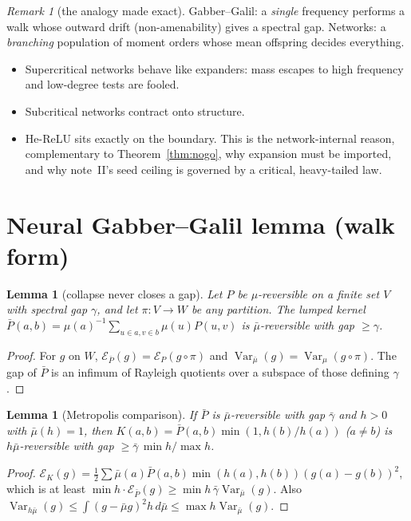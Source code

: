 \documentclass[11pt]{article}
\newtheorem{lemma}[theorem]{Lemma}
\theoremstyle{definition}
\theoremstyle{remark}
\newtheorem{remark}[theorem]{Remark}
\newcommand{\Var}{\operatorname{Var}}
\begin{document}
\begin{remark}[the analogy made exact]
Gabber--Galil: a \emph{single} frequency performs a walk whose outward drift (non-amenability) gives a spectral gap. Networks: a \emph{branching} population of moment orders whose mean offspring decides everything.
\begin{itemize}
\item Supercritical networks behave like expanders: mass escapes to high frequency and low-degree tests are fooled.
\item Subcritical networks contract onto structure.
\item He-ReLU sits exactly on the boundary. This is the network-internal reason, complementary to Theorem~\ref{thm:nogo}, why expansion must be imported, and why note~II's seed ceiling is governed by a critical, heavy-tailed law.
\end{itemize}
\end{remark}

\section{Neural Gabber--Galil lemma (walk form)}

\begin{lemma}[collapse never closes a gap]\label{lem:collapse}
Let $P$ be $\mu$-reversible on a finite set $V$ with spectral gap $\gamma$, and let $\pi:V\to W$ be any partition. The lumped kernel $\bar P(a,b)=\mu(a)^{-1}\sum_{u\in a,v\in b}\mu(u)P(u,v)$ is $\bar\mu$-reversible with gap $\ge\gamma$.
\end{lemma}

\begin{proof}
For $g$ on $W$, $\mathcal E_{\bar P}(g)=\mathcal E_P(g\circ\pi)$ and $\Var_{\bar\mu}(g)=\Var_\mu(g\circ\pi)$. The gap of $\bar P$ is an infimum of Rayleigh quotients over a subspace of those defining $\gamma$.
\end{proof}

\begin{lemma}[Metropolis comparison]\label{lem:metro}
If $\bar P$ is $\bar\mu$-reversible with gap $\bar\gamma$ and $h>0$ with $\bar\mu(h)=1$, then $K(a,b)=\bar P(a,b)\min(1,h(b)/h(a))$ ($a\ne b$) is $h\bar\mu$-reversible with gap $\ge\bar\gamma\,\min h/\max h$.
\end{lemma}

\begin{proof}
$\mathcal E_K(g)=\frac12\sum\bar\mu(a)\bar P(a,b)\min(h(a),h(b))(g(a)-g(b))^2$, which is at least $\min h\cdot\mathcal E_{\bar P}(g)\ge\min h\,\bar\gamma\Var_{\bar\mu}(g)$. Also $\Var_{h\bar\mu}(g)\le\int(g-\bar\mu g)^2h\,d\bar\mu\le\max h\Var_{\bar\mu}(g)$.
\end{proof}
\end{document}
